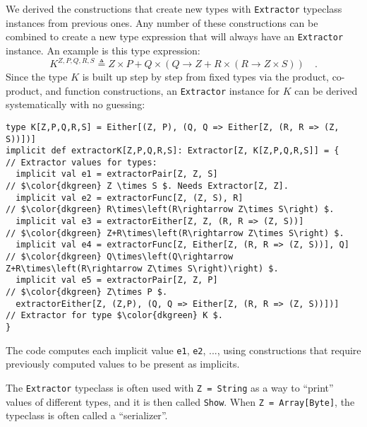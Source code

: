 We derived the constructions that create new types with \lstinline!Extractor!
typeclass instances from previous ones. Any number of these constructions
can be combined to create a new type expression that will always have
an \lstinline!Extractor! instance. An example is this type expression:
\[
K^{Z,P,Q,R,S}\triangleq Z\times P+Q\times\left(Q\rightarrow Z+R\times\left(R\rightarrow Z\times S\right)\right)\quad.
\]
Since the type $K$ is built up step by step from fixed types via
the product, co-product, and function constructions, an \lstinline!Extractor!
instance for $K$ can be derived systematically with no guessing:
\begin{lstlisting}[mathescape=true]
type K[Z,P,Q,R,S] = Either[(Z, P), (Q, Q => Either[Z, (R, R => (Z, S))])]
implicit def extractorK[Z,P,Q,R,S]: Extractor[Z, K[Z,P,Q,R,S]] = {   // Extractor values for types:
  implicit val e1 = extractorPair[Z, Z, S]                           // $\color{dkgreen} Z \times S $. Needs Extractor[Z, Z].
  implicit val e2 = extractorFunc[Z, (Z, S), R]                      // $\color{dkgreen} R\times\left(R\rightarrow Z\times S\right) $.
  implicit val e3 = extractorEither[Z, Z, (R, R => (Z, S))]          // $\color{dkgreen} Z+R\times\left(R\rightarrow Z\times S\right) $.
  implicit val e4 = extractorFunc[Z, Either[Z, (R, R => (Z, S))], Q] // $\color{dkgreen} Q\times\left(Q\rightarrow Z+R\times\left(R\rightarrow Z\times S\right)\right) $.
  implicit val e5 = extractorPair[Z, Z, P]                           // $\color{dkgreen} Z\times P $.
  extractorEither[Z, (Z,P), (Q, Q => Either[Z, (R, R => (Z, S))])]   // Extractor for type $\color{dkgreen} K $.
}
\end{lstlisting}
The code computes each implicit value \lstinline!e1!, \lstinline!e2!,
..., using constructions that require previously computed values to
be present as implicits.

The \lstinline!Extractor! typeclass is often used with \lstinline!Z = String!
as a way to \textsf{``}print\textsf{''} values of different types, and it is then
called \lstinline!Show!. When
\lstinline!Z = Array[Byte]!, the typeclass is often called a \textsf{``}serializer\textsf{''}. 

